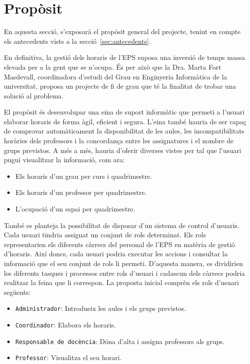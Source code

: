 \documentclass[a4paper,12pt]{ThesisStyle}
\begin{document}
\section{Propòsit}
\label{sec:proposit}

En aquesta secció, s'exposarà el propòsit general del projecte, tenint en compte els antecedents vists a la secció~\ref{sec:antecedents}.

En definitiva, la gestió dels horaris de l'EPS suposa una inversió de temps massa elevada per a la gent que se n'ocupa. És per això que la
Dra. Marta Fort Masdevall, coordinadora d'estudi del Grau en Enginyeria Informàtica de la universitat, proposa un projecte de fi de grau que té la finalitat
de trobar una solució al problema.

El propòsit és desenvolupar una eina de suport informàtic que permeti a l'usuari elaborar horaris de forma àgil, eficient i segura. L'eina també hauria de ser capaç
de comprovar automàticament la disponibilitat de les aules, les incompatibilitats horàries dels professors i la concordança entre les assignatures i el nombre de grups
previstos. A més a més, hauria d'oferir diverses vistes per tal que l'usuari pugui visualitzar la informació, com ara:
\begin{itemize}
  \item Els horaris d'un grau per curs i quadrimestre.
  \item Els horaris d'un professor per quadrimestre.
  \item L'ocupació d'un espai per quadrimestre.
\end{itemize}

També es planteja la possibilitat de disposar d'un sistema de control d'usuaris. Cada usuari tindria assignat un conjunt de rols determinat. Els rols representarien
els diferents càrrecs del personal de l'EPS en matèria de gestió d'horaris. Així doncs, cada usuari podria executar les accions i consultar la informació que el seu
conjunt de rols li permeti. D'aquesta manera, es dividirien les diferents tasques i processos entre rols d'usuari i cadascun dels càrrecs podria realitzar la feina
que li correspon. La proposta inicial comprèn els rols d'usuari següents:
\begin{itemize}
  \item \texttt{Administrador}: Introdueix les aules i els grups previstos.
  \item \texttt{Coordinador}: Elabora els horaris.
  \item \texttt{Responsable de docència}: Dóna d'alta i assigna professors als grups.
  \item \texttt{Professor}: Visualitza el seu horari.
\end{itemize}
\end{document}

